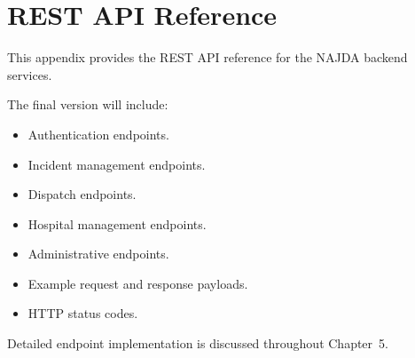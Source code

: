 \chapter{REST API Reference}
\label{appendix:api}

This appendix provides the REST API reference for the NAJDA backend services.

The final version will include:

\begin{itemize}
    \item Authentication endpoints.
    \item Incident management endpoints.
    \item Dispatch endpoints.
    \item Hospital management endpoints.
    \item Administrative endpoints.
    \item Example request and response payloads.
    \item HTTP status codes.
\end{itemize}

Detailed endpoint implementation is discussed throughout Chapter~5.
